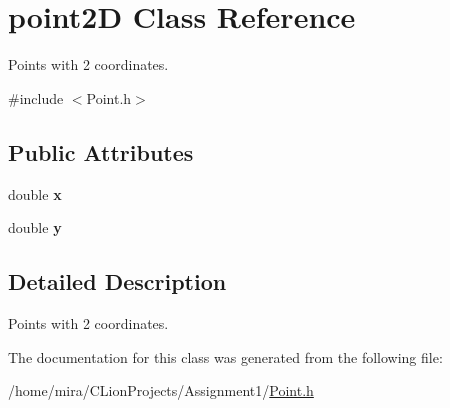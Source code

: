 \hypertarget{classpoint2D}{}\section{point2D Class Reference}
\label{classpoint2D}


Points with 2 coordinates.  




{\ttfamily \#include $<$Point.\+h$>$}

\subsection*{Public Attributes}
\begin{DoxyCompactItemize}
\item 
double {\bfseries x}\hypertarget{classpoint2D_ade69032d2a9596dfd5c2b3ee29551569}{}\label{classpoint2D_ade69032d2a9596dfd5c2b3ee29551569}

\item 
double {\bfseries y}\hypertarget{classpoint2D_aeb2d0d7a7919611c9b6022fec6ca0bc6}{}\label{classpoint2D_aeb2d0d7a7919611c9b6022fec6ca0bc6}

\end{DoxyCompactItemize}


\subsection{Detailed Description}
Points with 2 coordinates. 

The documentation for this class was generated from the following file\+:\begin{DoxyCompactItemize}
\item 
/home/mira/\+C\+Lion\+Projects/\+Assignment1/\hyperlink{Point_8h}{Point.\+h}\end{DoxyCompactItemize}
